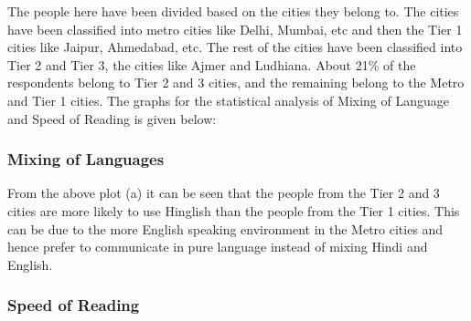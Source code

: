 \documentclass{article}
\begin{document}
The people here have been divided based on the cities they belong to. The cities have been classified into metro cities like Delhi, Mumbai, etc and then the Tier 1 cities like Jaipur, Ahmedabad, etc. The rest of the cities have been classified into Tier 2 and Tier 3, the cities like Ajmer and Ludhiana. About 21\% of the respondents belong to Tier 2 and 3 cities, and the remaining belong to the Metro and Tier 1 cities. The graphs for the statistical analysis of Mixing of Language and Speed of Reading is given below:

\begin{figure}[H]
    \centering
\end{figure}


\subsubsection{Mixing of Languages}

From the above plot (a) it can be seen that the people from the Tier 2 and 3 cities are more likely to use Hinglish than the people from the Tier 1 cities. This can be due to the more English speaking environment in the Metro cities and hence prefer to communicate in pure language instead of mixing Hindi and English.

\subsubsection{Speed of Reading}
\end{document}
